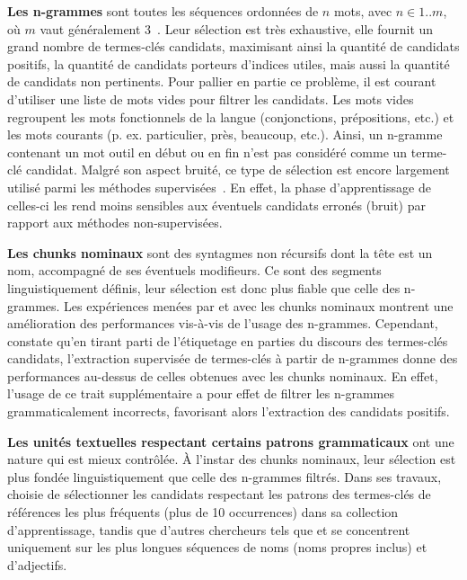      \textbf{Les n-grammes} sont toutes les séquences ordonnées de $n$ mots,
      avec $n \in 1..m$, où $m$ vaut généralement
      3~\citep{witten1999kea,turney1999learningalgorithms,hulth2003keywordextraction}.
      Leur sélection est très exhaustive, elle fournit un grand nombre de
      termes-clés candidats, maximisant ainsi la quantité de candidats positifs,
      la quantité de candidats porteurs d'indices utiles, mais aussi la quantité
      de candidats non pertinents. Pour pallier en partie ce problème, il est
      courant d'utiliser une liste de mots vides pour filtrer les candidats. Les
      mots vides regroupent les mots fonctionnels de la langue (conjonctions,
      prépositions, etc.) et les mots courants (p. ex. \og{}particulier\fg{},
      \og{}près\fg{}, \og{}beaucoup\fg{}, etc.). Ainsi, un n-gramme contenant un
      mot outil en début ou en fin n'est pas considéré comme un terme-clé
      candidat. Malgré son aspect bruité, ce type de sélection est encore
      largement utilisé parmi les méthodes
      supervisées~\citep{witten1999kea,turney1999learningalgorithms,hulth2003keywordextraction}.
      En effet, la phase d'apprentissage de celles-ci les rend moins sensibles
      aux éventuels candidats erronés (bruit) par rapport aux méthodes
      non-supervisées.

      \textbf{Les chunks nominaux} sont des syntagmes non récursifs dont la tête
      est un nom, accompagné de ses éventuels modifieurs. Ce sont des segments
      linguistiquement définis, leur sélection est donc plus fiable que celle
      des n-grammes. Les expériences menées par
      \citet{hulth2003keywordextraction} et \citet{eichler2010keywe} avec les
      chunks nominaux montrent une amélioration des performances vis-à-vis de
      l'usage des n-grammes. Cependant, \citet{hulth2003keywordextraction}
      constate qu'en tirant parti de l'étiquetage en parties du discours des
      termes-clés candidats, l'extraction supervisée de termes-clés à partir de
      n-grammes donne des performances au-dessus de celles obtenues avec les
      chunks nominaux. En effet, l'usage de ce trait supplémentaire a pour effet
      de filtrer les n-grammes grammaticalement incorrects, favorisant alors
      l'extraction des candidats positifs.

      \textbf{Les unités textuelles respectant certains patrons grammaticaux}
      ont une nature qui est mieux contrôlée. À l'instar des chunks nominaux,
      leur sélection est plus fondée linguistiquement que celle des n-grammes
      filtrés. Dans ses travaux, \citet{hulth2003keywordextraction} choisie de
      sélectionner les candidats respectant les patrons des termes-clés de
      références les plus fréquents (plus de 10 occurrences) dans sa collection
      d'apprentissage, tandis que d'autres chercheurs tels que
      \citet{wan2008expandrank} et \citet{hassan2010conundrums} se concentrent
      uniquement sur les plus longues séquences de noms (noms propres inclus) et
      d'adjectifs.

